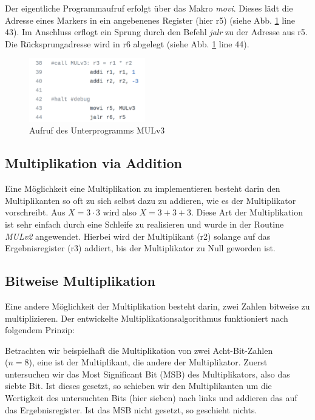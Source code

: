 \documentclass[fleqn, a4paper, 11pt]{article}       %
\begin{document}
Der eigentliche Programmaufruf erfolgt über das Makro \emph{movi}. Dieses lädt die Adresse eines Markers in ein angebenenes Register (hier r5) (siehe Abb. \ref{fig:FKT} line 43). Im Anschluss erflogt ein Sprung durch den Befehl \emph{jalr} zu der Adresse aus r5. Die Rücksprungadresse wird in r6 abgelegt (siehe Abb. \ref{fig:FKT} line 44).

\begin{figure}[h]
    \includegraphics[width =0.45\textwidth]{Funktionsaufruf.png}
\caption{Aufruf des Unterprogramms MULv3}
\label{fig:FKT}
\end{figure}


\subsection{Multiplikation via Addition}
Eine Möglichkeit eine Multiplikation zu implementieren besteht darin den Multiplikanten so oft zu sich selbst dazu zu addieren, wie es der Multiplikator vorschreibt. Aus $X = 3 \cdot 3$ wird also $X = 3+3+3$. Diese Art der Multiplikation ist sehr einfach durch eine Schleife zu realisieren und wurde in der Routine \emph{MULv2} angewendet. Hierbei wird der Multiplikant (r2) solange auf das Ergebnisregister (r3) addiert, bis der Multiplikator zu Null geworden ist. 

\subsection{Bitweise Multiplikation}
Eine andere Möglichkeit der Multiplikation besteht darin, zwei Zahlen bitweise zu multiplizieren. Der entwickelte Multiplikationsalgorithmus funktioniert nach folgendem Prinzip: 

Betrachten wir beispielhaft die Multiplikation von zwei Acht-Bit-Zahlen \\ ($n = 8$), eine ist der Multiplikant, die andere der Multiplikator. Zuerst untersuchen wir das Most Significant Bit (MSB) des Multiplikators, also das siebte Bit. Ist dieses gesetzt, so schieben wir den Multiplikanten um die Wertigkeit des untersuchten Bits (hier sieben) nach links und addieren das auf das Ergebnisregister. Ist das MSB nicht gesetzt, so geschieht nichts. \cite{MULv3}
\end{document}
